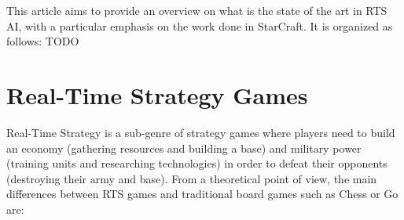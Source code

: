\documentclass{llncs}
\begin{document}
This article aims to  provide an overview on what is  the state of the
art  in  RTS AI,  with  a  particular emphasis  on  the  work done  in
StarCraft.  It is organized as follows: 
{\color{blue} TODO}



\section{Real-Time Strategy Games}\label{sec:rts}

Real-Time Strategy is a sub-genre of strategy games where players need
to  build an  economy (gathering  resources and  building a  base) and
military power (training units  and researching technologies) in order
to defeat  their opponents  (destroying their army  and base).  From a
theoretical point of view, the  main differences between RTS games and
traditional board games such as Chess or Go are:
\end{document}
